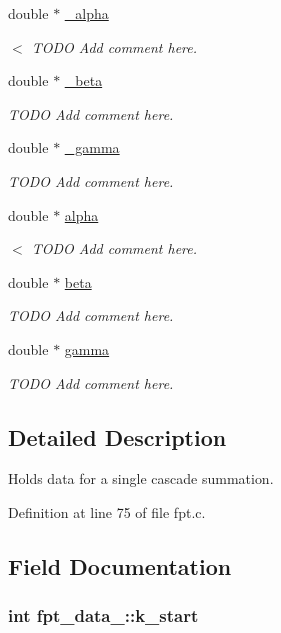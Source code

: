 \begin{DoxyCompactItemize}
double $\ast$ \hyperlink{structfpt__data___a048079e693b84da0013ed8edba95a2e7}{\-\_\-alpha}
\begin{DoxyCompactList}\small\item\em $<$ T\-O\-D\-O Add comment here. \end{DoxyCompactList}\item 
double $\ast$ \hyperlink{structfpt__data___aeb8f8f8eb1c0b93d135e8e083835edfb}{\-\_\-beta}
\begin{DoxyCompactList}\small\item\em T\-O\-D\-O Add comment here. \end{DoxyCompactList}\item 
double $\ast$ \hyperlink{structfpt__data___a1fb58e76d4d78d6ed0f71a040d7157dc}{\-\_\-gamma}
\begin{DoxyCompactList}\small\item\em T\-O\-D\-O Add comment here. \end{DoxyCompactList}\item 
double $\ast$ \hyperlink{structfpt__data___ad56b765b9faabb4071e844e7d1355151}{alpha}
\begin{DoxyCompactList}\small\item\em $<$ T\-O\-D\-O Add comment here. \end{DoxyCompactList}\item 
double $\ast$ \hyperlink{structfpt__data___af28f490521ca26420df33a1f590363e3}{beta}
\begin{DoxyCompactList}\small\item\em T\-O\-D\-O Add comment here. \end{DoxyCompactList}\item 
double $\ast$ \hyperlink{structfpt__data___a13aaa57c27f3ab5eab4c28d47d501723}{gamma}
\begin{DoxyCompactList}\small\item\em T\-O\-D\-O Add comment here. \end{DoxyCompactList}\end{DoxyCompactItemize}


\subsection{Detailed Description}
Holds data for a single cascade summation. 

Definition at line 75 of file fpt.\-c.



\subsection{Field Documentation}
\hypertarget{structfpt__data___aeed5a13bcd0301058d37d0446d735334}{
\subsubsection[{k\-\_\-start}]{\setlength{\rightskip}{0pt plus 5cm}int fpt\-\_\-data\-\_\-\-::k\-\_\-start}}\label{structfpt__data___aeed5a13bcd0301058d37d0446d735334}


